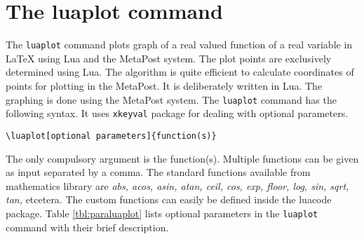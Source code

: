 \documentclass{article}
\begin{document}
\section{The luaplot command}
The \verb|luaplot| command plots graph of a real valued function of a real variable in LaTeX using Lua and the MetaPost system. The plot points are exclusively determined using Lua. The algorithm is quite efficient to calculate coordinates of points for plotting in the MetaPost. It is deliberately written in Lua. The graphing is done using the MetaPost system. The \verb|luaplot| command has the following syntax. It uses \verb|xkeyval| package \cite{online.xkeyval} for dealing with optional parameters. 
\begin{center}
\begin{lstlisting}[caption={[]}]
\luaplot[optional parameters]{function(s)}
\end{lstlisting}
\end{center}
The only compulsory argument is the function(s).  Multiple functions can be given as input separated by a comma. The standard functions available from mathematics library are \emph{abs, acos, asin, atan, ceil, cos, exp, floor, log, sin, sqrt, tan,}  etcetera. The custom functions can easily be defined inside the luacode package.  Table \ref{tbl:paraluaplot} lists optional parameters in the \verb|luaplot| command with their brief description.
\end{document}
